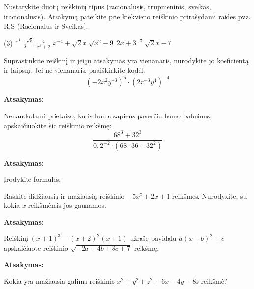 \documentclass[12pt]{exam}
\newcommand{\atsakymas}{%
    \par\vspace{0.3cm}
    \textbf{Atsakymas:} \framebox[7cm]{\rule{0pt}{0.7cm}}
}
\begin{document}
\begin{questions}

\question[3] Nustatykite duotų reiškinių tipus (racionalusis, trupmeninis, sveikas, iracionalusis). Atsakymą pateikite prie kiekvieno reiškinio prirašydami raides pvz. R,S (Racionalus ir Sveikas).
\begin{tasks}[label-width=1.2em](3)
    \task $\displaystyle \frac{x^4 - \sqrt{5}}{3}$
    \task $\displaystyle \frac{4}{x^3 + 2}$
    \task $\displaystyle x^{-4} + \sqrt{2} x$
    \task $\displaystyle \sqrt{x^2 - 9}$
    \task $\displaystyle 2x+3 ^{-2} $
    \task $\displaystyle \sqrt{2}x-7 $
\end{tasks}
\droppoints

\question[4] Suprastinkite reiškinį ir jeigu atsakymas yra vienanaris, nurodykite jo koeficientą ir laipsnį. Jei ne vienanaris, paaiškinkite kodėl.
$$ \left( -2x^2y^{-3} \right)^5 \cdot \left( 2x^{-3}y^4 \right)^{-4} $$
\droppoints
\vspace{2.5cm}
\atsakymas

\question[4] Nenaudodami prietaiso, kuris homo sapiens paverčia homo babuinus, apskaičiuokite šio reiškinio reikšmę:
 $$\displaystyle \frac{68^3 + 32^3}{0,2 ^{-2} \cdot (68 \cdot 36+32 ^{2} ) } $$ \droppoints
\vspace{3.5cm}
\atsakymas

\question Įrodykite formules:
\newpage

\question[4] Raskite didžiausią ir mažiausią reiškinio $-5x^2 + 2 x + 1$ reikšmes. Nurodykite, su kokia $x$ reikšmėmis jos gaunamos.
\droppoints
\vspace{3.5cm}
\atsakymas

\question[5]  Reiškinį $(x+1) ^{3} -(x+2) ^{2} (x+1)$ užrašę pavidalu $a(x+b)^{2} + c$ apskaičiuote reiškinio $\sqrt{-2a-4b+8c+7} $ reikšmę.   
\droppoints
\vspace{3.5cm}
\atsakymas

\question[4] Kokia yra mažiausia galima reiškinio $x ^{2} +y ^{2} + z ^{2} +6x-4y-8z$ reikšmė? 
\droppoints
\vspace{1cm}

\end{questions}
\end{document}
